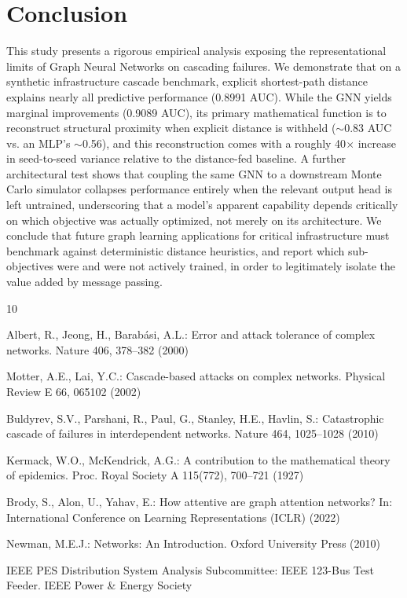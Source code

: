\documentclass[10pt]{article}
\begin{document}
\section{Conclusion}
This study presents a rigorous empirical analysis exposing the representational limits of Graph Neural Networks on cascading failures. We demonstrate that on a synthetic infrastructure cascade benchmark, explicit shortest-path distance explains nearly all predictive performance (0.8991 AUC). While the GNN yields marginal improvements (0.9089 AUC), its primary mathematical function is to reconstruct structural proximity when explicit distance is withheld ($\sim$0.83 AUC vs. an MLP's $\sim$0.56), and this reconstruction comes with a roughly 40$\times$ increase in seed-to-seed variance relative to the distance-fed baseline. A further architectural test shows that coupling the same GNN to a downstream Monte Carlo simulator collapses performance entirely when the relevant output head is left untrained, underscoring that a model's apparent capability depends critically on which objective was actually optimized, not merely on its architecture. We conclude that future graph learning applications for critical infrastructure must benchmark against deterministic distance heuristics, and report which sub-objectives were and were not actively trained, in order to legitimately isolate the value added by message passing.

\begin{thebibliography}{10}
\small
\setlength{\itemsep}{0.5pt}

 Albert, R., Jeong, H., Barab\'{a}si, A.L.: Error and attack tolerance of complex networks. Nature 406, 378--382 (2000)

 Motter, A.E., Lai, Y.C.: Cascade-based attacks on complex networks. Physical Review E 66, 065102 (2002)

 Buldyrev, S.V., Parshani, R., Paul, G., Stanley, H.E., Havlin, S.: Catastrophic cascade of failures in interdependent networks. Nature 464, 1025--1028 (2010)

 Kermack, W.O., McKendrick, A.G.: A contribution to the mathematical theory of epidemics. Proc. Royal Society A 115(772), 700--721 (1927)

 Brody, S., Alon, U., Yahav, E.: How attentive are graph attention networks? In: International Conference on Learning Representations (ICLR) (2022)

 Newman, M.E.J.: Networks: An Introduction. Oxford University Press (2010)

 IEEE PES Distribution System Analysis Subcommittee: IEEE 123-Bus Test Feeder. IEEE Power \& Energy Society

\end{thebibliography}
\end{document}
